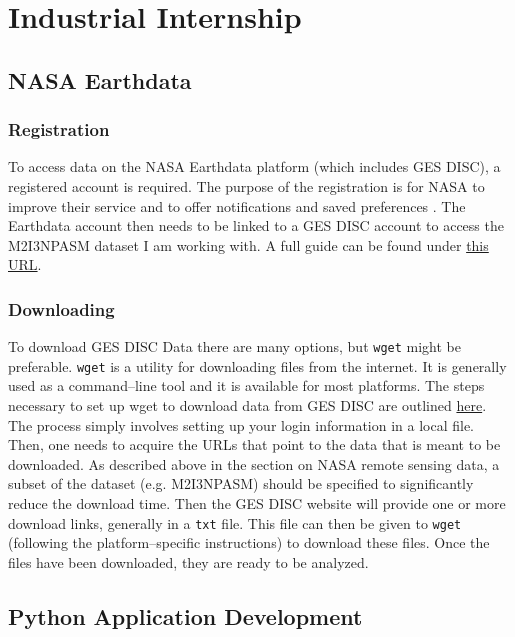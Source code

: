 \documentclass[../00_main.tex]{subfiles}
\begin{document}
\section{Industrial Internship}

\subsection{NASA Earthdata}

\subsubsection{Registration}

To access data on the NASA Earthdata platform (which includes GES DISC),
a registered account is required. The purpose of the registration is for NASA
to improve their service and to offer notifications and saved preferences
\cite{earthdata-policy}.
The Earthdata account then needs to be linked to a GES DISC account to access
the M2I3NPASM dataset I am working with. A full guide can be found under 
\href{https://www.unidata.ucar.edu/software/netcdf/}{this URL}.

\subsubsection{Downloading}

To download GES DISC Data there are many options, but \texttt{wget}
might be preferable. \texttt{wget} is a utility for downloading files from the
internet. It is generally used as a command--line tool and it is available for
most platforms. The steps necessary to set up wget to download data from GES
DISC are outlined 
\href{https://disc.gsfc.nasa.gov/data-access#mac_linux_wget}{here}. The process
simply involves setting up your login information in a local file. Then, one
needs to acquire the URLs that point to the data that is meant to be
downloaded. As described above in the section on NASA remote sensing data,
a subset of the dataset (e.g. M2I3NPASM) should be specified to significantly
reduce the download time. Then the GES DISC website will provide one or more
download links, generally in a \texttt{txt} file. This file can then be given
to \texttt{wget} (following the platform--specific instructions) to download
these files. Once the files have been downloaded, they are ready to be
analyzed. 

\subsection{Python Application Development}
\end{document}
